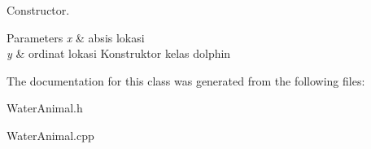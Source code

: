 Constructor. 


\begin{DoxyParams}{Parameters}
{\em x} & absis lokasi \\
\hline
{\em y} & ordinat lokasi Konstruktor kelas dolphin \\
\hline
\end{DoxyParams}


The documentation for this class was generated from the following files\+:\begin{DoxyCompactItemize}
\item 
Water\+Animal.\+h\item 
Water\+Animal.\+cpp\end{DoxyCompactItemize}
